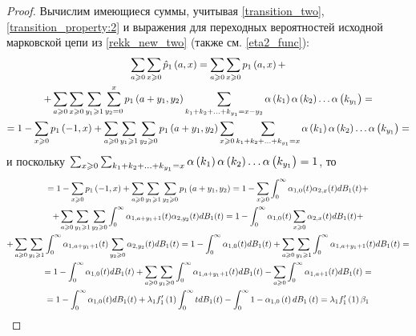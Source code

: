 \documentclass[a4paper,14pt,russian]{article}
\newcommand{\p}{\hat{p}}
\begin{document}
\begin{proof}
Вычислим имеющиеся суммы, учитывая \eqref{transition_two}, \eqref{transition_property:2} и
выражения для переходных вероятностей исходной марковской цепи из \eqref{rekk_new_two} (также см. \eqref{eta2_func}):
\begin{multline*}
\sum_{a\geqslant 0}\sum_{x\geqslant 0} \p_1\br{a,x} =\sum_{a\geqslant 0}\sum_{x\geqslant 0} p_1\br{a,x}  +\\+ \sum_{a\geqslant 0}\sum_{x\geqslant 0} \sum_{y_1 \geqslant 1} \sum_{y_2 = 0}^{x} p_1\br{a + y_1, y_2}
\sum_{k_1 + k_2 + \ldots + k_{y_1} = x - y_2} \alpha\br{k_1} \alpha\br{k_2} \ldots \alpha\br{k_{y_1}} = \\=
1 - \sum_{x\geqslant 0} p_1\br{-1,x}  + \sum_{a\geqslant 0}\sum_{y_1 \geqslant 1} \sum_{y_2 \geqslant 0} p_1\br{a+y_1,y_2}\sum_{x \geqslant 0} \sum_{k_1 + k_2 + \ldots + k_{y_1} = x} \alpha\br{k_1} \alpha\br{k_2} \ldots \alpha\br{k_{y_1}} =
\end{multline*}
и поскольку $\sum_{x \geqslant 0} \sum_{k_1 + k_2 + \ldots + k_{y_1} = x} \alpha\left(k_1\right) \alpha\left(k_2\right) \ldots \alpha\left(k_{y_1}\right) = 1$, то 
\begin{multline*}
= 1 - \sum_{x\geqslant 0} p_1\left(-1,x\right)  + \sum_{a\geqslant 0}\sum_{y_1 \geqslant 1} \sum_{y_2 \geqslant 0} p_1\left(a+y_1,y_2\right) =  1 - \sum_{x\geqslant 0} \int_{0}^{\infty} \alpha_{1,0} (t) \alpha_{2,x} (t)  dB_1(t)  +\\
+ \sum_{a\geqslant 0}\sum_{y_1 \geqslant 1} \sum_{y_2 \geqslant 0}  \int_{0}^{\infty} \alpha_{1,a + y_1 + 1} (t) \alpha_{2,y_2} (t)  dB_1(t) = 1 - \int_{0}^{\infty} \alpha_{1,0} (t) \sum_{x\geqslant 0}  \alpha_{2,x} (t)  dB_1(t) +\\
+ \sum_{a\geqslant 0}\sum_{y_1 \geqslant 1}  \int_{0}^{\infty} \alpha_{1,a + y_1 + 1} (t) \sum_{y_2 \geqslant 0} \alpha_{2,y_2} (t)  dB_1(t) = 
1 - \int_{0}^{\infty} \alpha_{1,0} (t) dB_1(t)  +  \sum_{a\geqslant 0}\sum_{y_1 \geqslant 1}  \int_{0}^{\infty} \alpha_{1,a + y_1 + 1} (t) dB_1(t)  = \\=
1 - \int_{0}^{\infty} \alpha_{1,0} (t) dB_1(t)  +  \sum_{a\geqslant 0}\sum_{y_1 \geqslant 0}  \int_{0}^{\infty} \alpha_{1,a + y_1 + 1} (t) dB_1(t)  - 
\sum_{a\geqslant 0} \int_{0}^{\infty} \alpha_{1,a + 1} (t) dB_1(t) = \\ =
1 - \int_{0}^{\infty} \alpha_{1,0} (t) dB_1(t)  + \lambda_1 f_1'\left(1\right)  \int_{0}^{\infty} t dB_1(t)  - \int_0^{\infty} 1 - \alpha_{1,0}\left(t\right)d B_1\left(t\right) = \lambda_1 f_1'\left(1\right) \beta_1
\end{multline*}


\end{proof}
\end{document}
